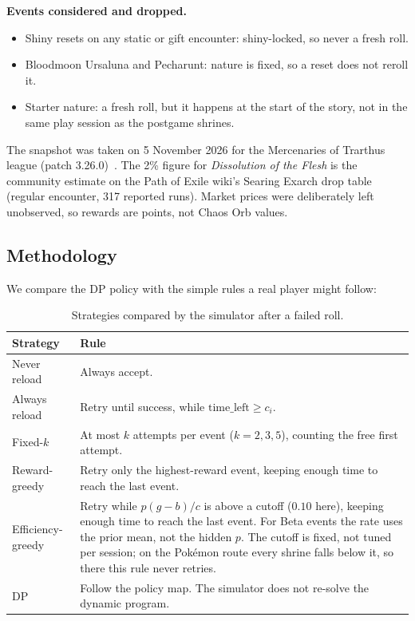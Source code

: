 \documentclass[11pt,a4paper]{article}
\newcommand{\who}[1]{}
\begin{document}
\textbf{Events considered and dropped.}
\begin{itemize}[nosep]
\item Shiny resets on any static or gift encounter: shiny-locked, so never a fresh roll.
\item Bloodmoon Ursaluna and Pecharunt: nature is fixed, so a reset does not reroll it.
\item Starter nature: a fresh roll, but it happens at the start of the story, not in the same play session as the postgame shrines.
\end{itemize}

The snapshot was taken on 5 November 2026 for the Mercenaries of Trarthus league (patch 3.26.0)~\cite{poe_mercenaries}. The 2\% figure for \emph{Dissolution of the Flesh} is the community estimate on the Path of Exile wiki's Searing Exarch drop table~\cite{poe_exarch_drops} (regular encounter, 317 reported runs). Market prices were deliberately left unobserved, so rewards are points, not Chaos Orb values.

\subsection{Methodology\who{Daniel}}
\label{sec:method}
We compare the DP policy with the simple rules a real player might follow:

\begin{table}[H]
\centering
\caption{Strategies compared by the simulator after a failed roll.}
\small
\begin{tabularx}{\textwidth}{@{}l X@{}}
\toprule
\textbf{Strategy} & \textbf{Rule} \\
\midrule
Never reload & Always accept. \\
Always reload & Retry until success, while $\mathrm{time\_left} \ge c_i$. \\
Fixed-$k$ & At most $k$ attempts per event ($k = 2,3,5$), counting the free first attempt. \\
Reward-greedy & Retry only the highest-reward event, keeping enough time to reach the last event. \\
Efficiency-greedy & Retry while $p(g-b)/c$ is above a cutoff ($0.10$ here), keeping enough time to reach the last event. For Beta events the rate uses the prior mean, not the hidden $p$. The cutoff is fixed, not tuned per session; on the Pok\'emon route every shrine falls below it, so there this rule never retries. \\
DP & Follow the policy map. The simulator does not re-solve the dynamic program. \\
\bottomrule
\end{tabularx}
\end{table}
\end{document}
